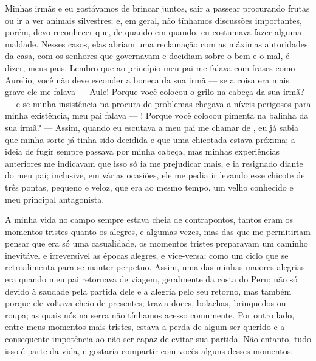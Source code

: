 Minhas irmãs e eu gostávamos de brincar juntos, sair a passear procurando frutas ou ir a ver animais silvestres; e, em geral, não tínhamos discussões importantes, porém, devo reconhecer que, de quando em quando, eu costumava fazer alguma maldade.
Nesses casos, elas abriam uma reclamação com as máximas autoridades da casa, com os senhores que governavam e decidiam sobre o bem e o mal, é dizer, meus pais. Lembro que ao princípio meu pai me falava com frases como --- Aurelio, você não deve esconder a boneca da sua irmã --- se a coisa era mais grave ele me falava --- Aule! Porque você colocou o grilo na cabeça da sua irmã? --- e se minha insistência na procura de problemas chegava a níveis perigosos para minha existência, meu pai falava --- \Aulicha! Porque você colocou pimenta na balinha da sua irmã? ---
Assim, quando eu escutava a meu pai me chamar de \Aulicha, eu já sabia que minha sorte já tinha sido decidida e que uma chicotada estava próxima; a ideia de fugir sempre passava por minha cabeça, mas minhas experiências anteriores me indicavam que isso só ia me prejudicar mais, e ia resignado diante do meu pai; inclusive, em várias ocasiões, ele me pedia ir levando esse chicote de três pontas, pequeno e veloz, que era ao mesmo tempo, um velho conhecido e meu principal antagonista.

A minha vida no campo sempre estava cheia de contrapontos, tantos eram os momentos tristes quanto os alegres, e algumas vezes, mas das que me permitiriam pensar que era só uma casualidade, os momentos tristes preparavam um caminho inevitável e irreversível as épocas alegres, e vice-versa; como um ciclo que se retroalimenta para se manter perpetuo. 
Assim, uma das minhas maiores alegrias era quando meu pai retornava de viagem, geralmente da costa do Peru; não só devido à saudade pela partida dele e a alegria pelo seu retorno, mas também porque ele voltava cheio de presentes; trazia doces, bolachas, brinquedos ou roupa; as quais nós na serra não tínhamos acesso comumente.
Por outro lado, entre meus momentos mais tristes, estava a perda de algum ser querido e a consequente impotência ao não ser capaz de evitar sua partida. 
Não entanto, tudo isso é parte da vida, e gostaria compartir com vocês alguns desses momentos.



